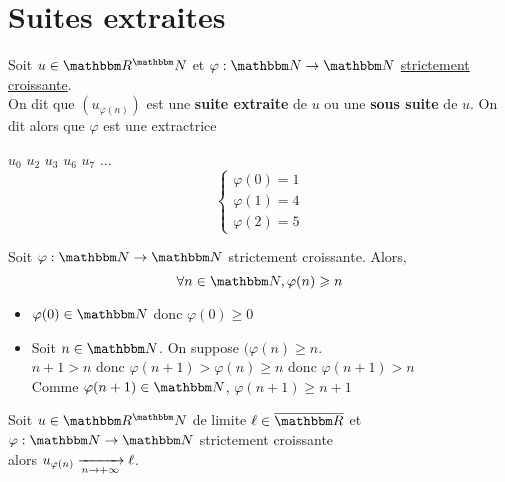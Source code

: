 \part{Suites extraites}

\begin{defn}
	Soit $u\in \R^\N$ et $\varphi: \N \to \N$ \underline{strictement croissante}. \\
	On dit que $\left( u_{\varphi(n)} \right) $ est une {\bf suite extraite} de $u$ ou une {\bf sous suite} de $u$. On dit alors que  $\varphi$ est une extractrice
\end{defn}

\begin{exm}
	$u_0$  $u_2$ $u_3$   $u_6$ $u_7$ $\ldots$\\

	\[
		\begin{cases}
			\varphi(0) = 1\\
			\varphi(1) = 4\\
			\varphi(2)=5
		\end{cases}
	\]
\end{exm}

\begin{lem}
	Soit $\varphi: \N\to\N$ strictement croissante. Alors,\[
	\forall n\in \N, \varphi(n) \ge  n
	\] 
\end{lem}

\begin{prv}
	\begin{itemize}
		\item $\varphi(0) \in \N$ donc $\varphi(0) \ge  0$ 
		\item Soit $n\in \N$. On suppose $(\varphi(n) \ge n$.\\
			$n+1>n$ donc $\varphi(n+1) > \varphi(n) \ge n$ donc $\varphi(n+1) > n$ \\
			Comme $\varphi(n+1)\in \N$, $\varphi(n+1) \ge  n+1$
	\end{itemize}
\end{prv}

\begin{prop}
	Soit $u\in \R^\N$ de limite $\ell\in \overline{\R}$ et $\varphi:\N\to \N$ strictement croissante\\
	alors $u_{\varphi(n)} \xrightarrow[n\to +\infty]{}\ell$.
\end{prop}


